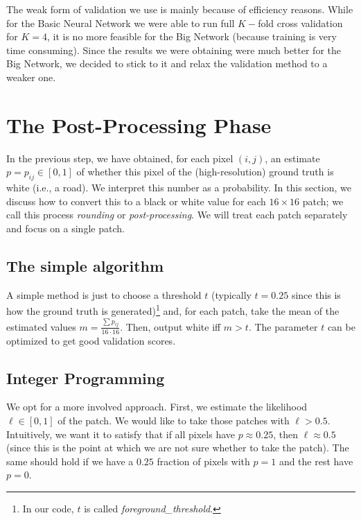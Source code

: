 \documentclass[10pt,conference,compsocconf]{IEEEtran}
\begin{document}
The weak form of validation we use is mainly because of efficiency reasons. While for the Basic Neural Network we were able to run full $K-$fold cross validation for $K=4$, it is no more feasible for the Big Network (because training is very time consuming). Since the results we were obtaining were much better for the Big Network, we decided to stick to it and relax the validation method to a weaker one.



\section{The Post-Processing Phase}



In the previous step, we have obtained, for each pixel $(i,j)$, an estimate $p = p_{ij} \in [0,1]$ of whether this pixel of the (high-resolution) ground truth is white (i.e., a road). We interpret this number as a probability. In this section, we discuss how to convert this to a black or white value for each $16 \times 16$ patch; we call this process \emph{rounding} or \emph{post-processing}. We will treat each patch separately and focus on a single patch.

\subsection{The simple algorithm}

A simple method is just to choose a threshold $t$ (typically $t = 0.25$ since this is how the ground truth is generated)\footnote{In our code, $t$ is called \textit{foreground\_threshold}.} and, for each patch, take the mean of the estimated values $m = \frac{\sum p_{ij}}{16 \cdot 16}$. Then, output white iff $m > t$. The parameter $t$ can be optimized to get good validation scores.



\subsection{Integer Programming}

We opt for a more involved approach. First, we estimate the likelihood $\ell \in [0,1]$ of the patch. We would like to take those patches with $\ell > 0.5$. Intuitively, we want it to satisfy that if all pixels have $p \approx 0.25$, then $\ell \approx 0.5$ (since this is the point at which we are not sure whether to take the patch). The same should hold if we have a $0.25$ fraction of pixels with $p = 1$ and the rest have $p = 0$.
\end{document}
